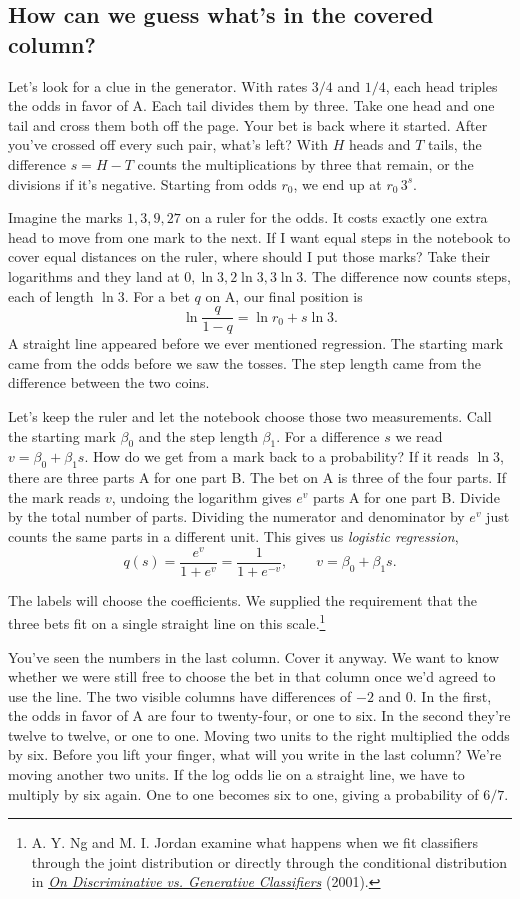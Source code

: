 \documentclass[12pt,oneside]{article}
\newcommand{\secao}[1]{\Needspace{5.2\baselineskip}\subsection*{#1}}
\newcommand{\bookanchor}[1]{\phantomsection\label{#1}}
\begin{document}
\secao{How can we guess what's in the covered column?}
Let's look for a clue in the generator. With rates $3/4$ and $1/4$, each head triples the odds in favor of A. Each tail divides them by three. Take one head and one tail and cross them both off the page. Your bet is back where it started. After you've crossed off every such pair, what's left? With $H$ heads and $T$ tails, the difference $s=H-T$ counts the multiplications by three that remain, or the divisions if it's negative. Starting from odds $r_0$, we end up at $r_0\,3^s$.

Imagine the marks $1,3,9,27$ on a ruler for the odds. It costs exactly one extra head to move from one mark to the next. If I want equal steps in the notebook to cover equal distances on the ruler, where should I put those marks? Take their logarithms and they land at $0,\ln 3,2\ln 3,3\ln 3$. The difference now counts steps, each of length $\ln 3$. For a bet $q$ on A, our final position is
\[
             \ln\frac{q}{1-q}=\ln r_0+s\ln 3 .
\]
A straight line appeared before we ever mentioned regression. The starting mark came from the odds before we saw the tosses. The step length came from the difference between the two coins.

Let's\bookanchor{topic-04-3} keep the ruler and let the notebook choose those two measurements. Call the starting mark $\beta_0$ and the step length $\beta_1$. For a difference $s$ we read $v=\beta_0+\beta_1s$. How do we get from a mark back to a probability? If it reads $\ln 3$, there are three parts A for one part B. The bet on A is three of the four parts. If the mark reads $v$, undoing the logarithm gives $e^v$ parts A for one part B. Divide by the total number of parts. Dividing the numerator and denominator by $e^v$ just counts the same parts in a different unit. This gives us \emph{logistic regression},
\[
              q(s)=\frac{e^v}{1+e^v}=\frac{1}{1+e^{-v}},
              \qquad v=\beta_0+\beta_1s .
\]

The labels will choose the coefficients. We supplied the requirement that the three bets fit on a single straight line on this scale.\footnote{A. Y. Ng and M. I. Jordan examine what happens when we fit classifiers through the joint distribution or directly through the conditional distribution in \href{https://proceedings.neurips.cc/paper_files/paper/2001/file/7b7a53e239400a13bd6be6c91c4f6c4e-Paper.pdf}{\emph{On Discriminative vs. Generative Classifiers}} (2001).}

You've seen the numbers in the last column. Cover it anyway. We want to know whether we were still free to choose the bet in that column once we'd agreed to use the line. The two visible columns have differences of $-2$ and $0$. In the first, the odds in favor of A are four to twenty-four, or one to six. In the second they're twelve to twelve, or one to one. Moving two units to the right multiplied the odds by six. Before you lift your finger, what will you write in the last column? We're moving another two units. If the log odds lie on a straight line, we have to multiply by six again. One to one becomes six to one, giving a probability of $6/7$.
\end{document}
